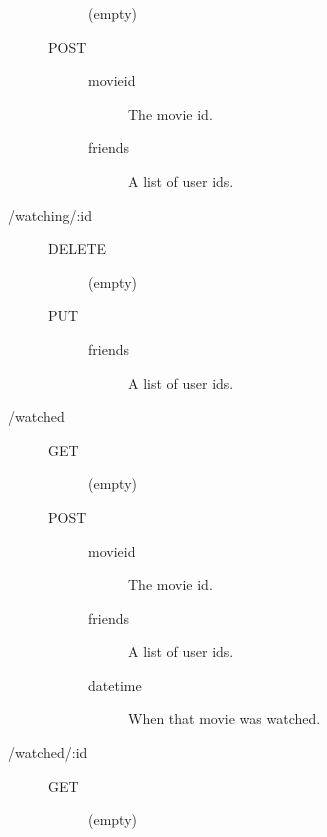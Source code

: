 \begin{description}
\begin{description}
        \begin{description}
          \item [(empty)]
        \end{description}
      \item [POST] \hfill
        \begin{description}
          \item [movieid] The movie id.
          \item [friends] A list of user ids.
        \end{description}
    \end{description}
  \item [/watching/:id] \hfill
    \begin{description}
      \item [DELETE] \hfill
        \begin{description}
          \item [(empty)]
        \end{description}
      \item [PUT] \hfill
        \begin{description}
          \item [friends] A list of user ids.
        \end{description}
    \end{description}
  \item [/watched] \hfill
    \begin{description}
      \item [GET] \hfill
        \begin{description}
          \item [(empty)]
        \end{description}
      \item [POST] \hfill
        \begin{description}
          \item [movieid] The movie id.
          \item [friends] A list of user ids.
          \item [datetime] When that movie was watched.
        \end{description}
    \end{description}
  \item [/watched/:id] \hfill
    \begin{description}
      \item [GET] \hfill
        \begin{description}
          \item [(empty)]

\end{description}
\end{description}
\end{description}

